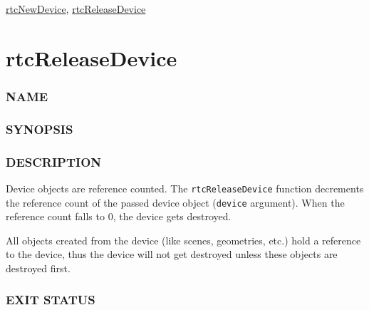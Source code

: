 \hyperref[rtcnewdevice]{rtcNewDevice},
\hyperref[rtcreleasedevice]{rtcReleaseDevice}

\pagebreak

\section{rtcReleaseDevice}\label{rtcreleasedevice}

\subsubsection{NAME}\label{name}

\begin{Shaded}
\begin{Highlighting}[]
\OperatorTok{{-}}
\end{Highlighting}
\end{Shaded}

\subsubsection{SYNOPSIS}\label{synopsis}

\begin{Shaded}
\begin{Highlighting}[]

\OperatorTok{(}\OperatorTok{);}
\end{Highlighting}
\end{Shaded}

\subsubsection{DESCRIPTION}\label{description}

Device objects are reference counted. The \texttt{rtcReleaseDevice}
function decrements the reference count of the passed device object
(\texttt{device} argument). When the reference count falls to 0, the
device gets destroyed.

All objects created from the device (like scenes, geometries, etc.) hold
a reference to the device, thus the device will not get destroyed unless
these objects are destroyed first.

\subsubsection{EXIT STATUS}\label{exit-status}

